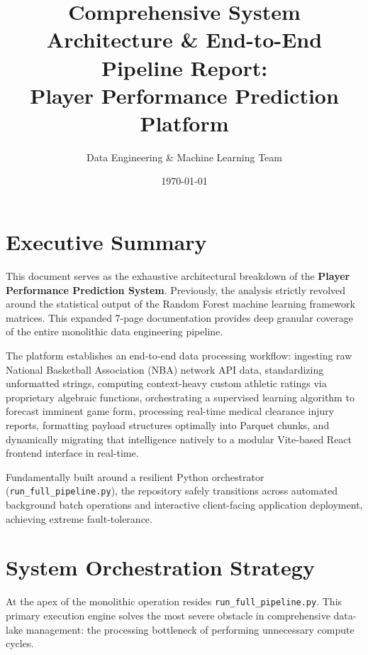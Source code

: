 \documentclass[12pt,a4paper]{article}
\title{\textbf{Comprehensive System Architecture \& End-to-End Pipeline Report:\\ Player Performance Prediction Platform}}
\author{Data Engineering \& Machine Learning Team}
\date{\today}
\begin{document}
\maketitle
\tableofcontents
\newpage

\section{Executive Summary}
This document serves as the exhaustive architectural breakdown of the \textbf{Player Performance Prediction System}. Previously, the analysis strictly revolved around the statistical output of the Random Forest machine learning framework matrices. This expanded 7-page documentation provides deep granular coverage of the entire monolithic data engineering pipeline. 

The platform establishes an end-to-end data processing workflow: ingesting raw National Basketball Association (NBA) network API data, standardizing unformatted strings, computing context-heavy custom athletic ratings via proprietary algebraic functions, orchestrating a supervised learning algorithm to forecast imminent game form, processing real-time medical clearance injury reports, formatting payload structures optimally into Parquet chunks, and dynamically migrating that intelligence natively to a modular Vite-based React frontend interface in real-time.

Fundamentally built around a resilient Python orchestrator (\texttt{run\_full\_pipeline.py}), the repository safely transitions across automated background batch operations and interactive client-facing application deployment, achieving extreme fault-tolerance.

\section{System Orchestration Strategy}
At the apex of the monolithic operation resides \texttt{run\_full\_pipeline.py}. This primary execution engine solves the most severe obstacle in comprehensive data-lake management: the processing bottleneck of performing unnecessary compute cycles.
\end{document}
